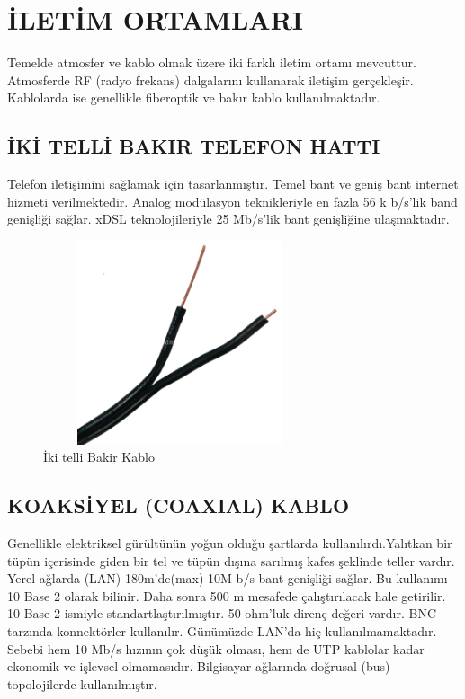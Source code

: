 \section{İLETİM ORTAMLARI}
Temelde atmosfer ve kablo olmak üzere iki farklı iletim ortamı mevcuttur. Atmosferde RF (radyo frekans) dalgalarını kullanarak  iletişim gerçekleşir.
Kablolarda ise genellikle fiberoptik ve bakır kablo kullanılmaktadır.

\subsection{İKİ TELLİ BAKIR TELEFON HATTI }
Telefon iletişimini sağlamak için tasarlanmıştır. Temel bant ve geniş bant internet hizmeti verilmektedir.
Analog modülasyon teknikleriyle en fazla 56 k b/s'lik band genişliği sağlar. xDSL teknolojileriyle 25 Mb/s'lik bant genişliğine ulaşmaktadır.
\begin{figure}[ht]
    \centering
    \includegraphics[width=8cm,height=6cm]{images/ikitellibakirkablo}
    \caption{İki telli Bakir Kablo}
    \label{fig:iki_telli_bakir_kablo}
\end{figure}

\subsection{KOAKSİYEL (COAXIAL) KABLO}
Genellikle elektriksel gürültünün yoğun olduğu şartlarda kullanılırdı.Yalıtkan bir tüpün içerisinde giden bir tel ve tüpün dışına sarılmış kafes şeklinde teller vardır.
Yerel ağlarda (LAN) 180m'de(max) 10M b/s bant genişliği sağlar. Bu kullanımı 10 Base 2 olarak bilinir. Daha sonra 500 m mesafede çalıştırılacak hale getirilir. 10 Base 2 ismiyle standartlaştırılmıştır. 50 ohm'luk direnç değeri vardır.
BNC tarzında konnektörler kullanılır. Günümüzde LAN'da hiç kullanılmamaktadır. Sebebi hem 10 Mb/s hızının çok düşük olması, hem de UTP kablolar kadar ekonomik ve işlevsel olmamasıdır.
Bilgisayar ağlarında doğrusal (bus) topolojilerde kullanılmıştır.

